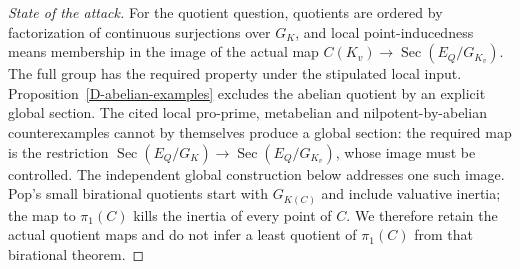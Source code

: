 \documentclass[11pt,oneside]{article}
\begin{document}
\begin{proof}[State of the attack]
For the quotient question, quotients are
ordered by factorization of continuous
surjections over $G_K$, and local
point-inducedness means membership in
the image of the actual map
$C(K_v)\to\operatorname{Sec}(E_Q/G_{K_v})$.
The full group has the required property
under the stipulated local input.
Proposition~\ref{D-abelian-examples}
excludes the abelian quotient by an
explicit global section. The cited
local pro-prime, metabelian and
nilpotent-by-abelian counterexamples
cannot by themselves produce a global
section: the required map is the
restriction
$\operatorname{Sec}(E_Q/G_K)\to
\operatorname{Sec}(E_Q/G_{K_v})$,
whose image must be controlled.
The independent global construction
below addresses one such image.
Pop's small birational quotients start
with $G_{K(C)}$ and include valuative
inertia; the map to $\pi_1(C)$ kills
the inertia of every point of $C$.
We therefore retain the actual quotient
maps and do not infer a least quotient
of $\pi_1(C)$ from that birational theorem.
\end{proof}
\end{document}
